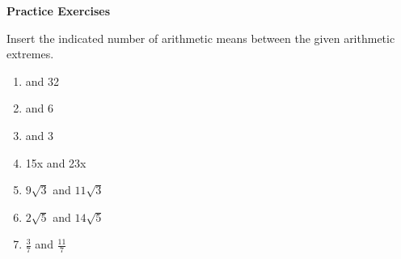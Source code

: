\textbf{Practice Exercises}

\vspce

Insert the indicated number of arithmetic means between the given arithmetic extremes.  
\begin{enumerate}
\item {} and  32  \hspce [1]
\item {} and  6  \hspce [3]
\item {} and  3 \hspce  [4]
\item \hspce 15x and  23x  \hspce [1] 
\item \hspce $9\sqrt{3}$ and $11\sqrt{3}$ \hspce [1] 
\item \hspce $2\sqrt{5}$ and $14\sqrt{5}$ \hspce [2] 
\item \hspce $\displaystyle \frac{3}{7}$ and $ \displaystyle \frac{11}{7}$ \hspce [1]
\end{enumerate}